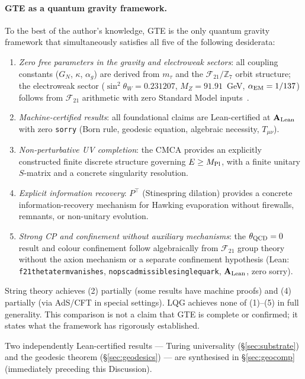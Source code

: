 \documentclass[11pt]{article}
\theoremstyle{remark}
\newcommand{\ZS}{\mathbb{Z}_7}
\newcommand{\lean}[1]{%
  \penalty-100
  \begingroup\def\_{\textunderscore\allowbreak}\texttt{#1}\endgroup}
\newcommand{\FTT}{\mathcal{F}_{21}}
\newcommand{\CatAL}{\ensuremath{\textbf{A}_{\rm Lean}}}
\begin{document}
\paragraph{GTE as a quantum gravity framework.}
To the best of the author's knowledge, GTE is the only quantum gravity framework
that simultaneously satisfies all five of the following desiderata:
\begin{enumerate}[noitemsep]
\item \emph{Zero free parameters in the gravity and electroweak sectors}:
  all coupling constants ($G_N$, $\kappa$, $\alpha_g$) are derived from $m_\tau$
  and the $\FTT/\ZS$ orbit structure; the electroweak sector
  ($\sin^2\theta_W = 0.231207$, $M_Z = 91.91$~GeV, $\alpha_{\rm EM} = 1/137$)
  follows from $\FTT$ arithmetic with zero Standard Model inputs~\cite{SpivackGTEUnification}.
\item \emph{Machine-certified results}: all foundational claims are Lean-certified
  at $\CatAL$ with zero \texttt{sorry} (Born rule, geodesic equation,
  algebraic necessity, $T_{\mu\nu}$).
\item \emph{Non-perturbative UV completion}: the CMCA provides an explicitly
  constructed finite discrete structure governing $E\geq M_{\rm Pl}$,
  with a finite unitary $S$-matrix and a concrete singularity resolution.
\item \emph{Explicit information recovery}: $P^\top$ (Stinespring dilation)
  provides a concrete information-recovery mechanism for Hawking evaporation
  without firewalls, remnants, or non-unitary evolution.
\item \emph{Strong CP and confinement without auxiliary mechanisms}: the $\theta_{\rm QCD}
  = 0$ result and colour confinement follow algebraically from $\FTT$ group theory
  without the axion mechanism or a separate confinement hypothesis
  (Lean: \lean{f21\_theta\_term\_vanishes}, \lean{no\_psc\_admissible\_single\_quark},
  $\CatAL$, zero sorry).
\end{enumerate}
String theory achieves (2) partially (some results have machine proofs) and
(4) partially (via AdS/CFT in special settings).  LQG achieves none of
(1)--(5) in full generality.  This comparison is not a claim that GTE is
complete or confirmed; it states what the framework has rigorously established.

Two independently Lean-certified results --- Turing universality (\S\ref{sec:substrate})
and the geodesic theorem (\S\ref{sec:geodesics}) --- are synthesised in
\S\ref{sec:geocomp} (immediately preceding this Discussion).
\end{document}
